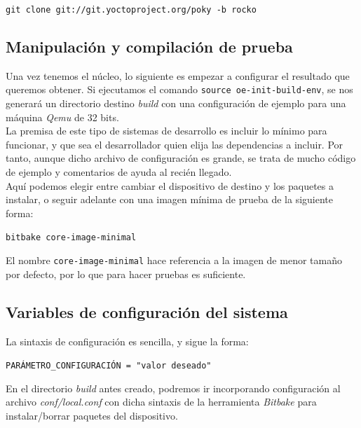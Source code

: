 \begin{center}
\texttt{git clone git://git.yoctoproject.org/poky -b rocko}
\end{center}

\subsection{Manipulación y compilación de prueba}

Una vez tenemos el núcleo, lo siguiente es empezar a configurar el resultado que queremos obtener. Si ejecutamos el comando \texttt{source oe-init-build-env}, se nos generará un directorio destino \textit{build} con una configuración de ejemplo para una máquina \textit{Qemu} de 32 bits.\\ 

La premisa de este tipo de sistemas de desarrollo es incluir lo mínimo para funcionar, y que sea el desarrollador quien elija las dependencias a incluir. Por tanto, aunque dicho archivo de configuración es grande, se trata de mucho código de ejemplo y comentarios de ayuda al recién llegado.\\

Aquí podemos elegir entre cambiar el dispositivo de destino y los paquetes a instalar, o seguir adelante con una imagen mínima de prueba de la siguiente forma:

\begin{center}
\texttt{bitbake core-image-minimal}
\end{center}

El nombre \texttt{core-image-minimal} hace referencia a la imagen de menor tamaño por defecto, por lo que para hacer pruebas es suficiente. \\

\subsection{Variables de configuración del sistema}

La sintaxis de configuración es sencilla, y sigue la forma: 

\begin{center}
	\texttt{PARÁMETRO\_CONFIGURACIÓN = "valor deseado"}
\end{center}

En el directorio \textit{build} antes creado, podremos ir incorporando configuración al archivo \textit{conf/local.conf} con dicha sintaxis de la herramienta \textit{Bitbake} para instalar/borrar paquetes del dispositivo.\\

